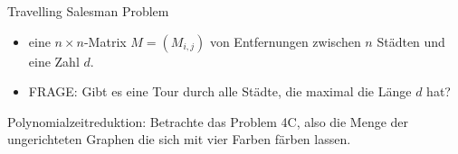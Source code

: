\documentclass[10pt, a4paper]{exam}
\begin{document}
\begin{questions}
\begin{parts}
\begin{solution}
      Travelling Salesman Problem
      \begin{itemize}
        \item eine $n\times n$-Matrix $M=(M_{i,j})$ von Entfernungen zwischen $n$ Städten und eine Zahl $d$.
        \item FRAGE: Gibt es eine Tour durch alle Städte, die maximal die Länge $d$ hat?
      \end{itemize}

    \end{solution}
  \end{parts}

  \question Polynomialzeitreduktion: Betrachte das Problem 4C, also die Menge der ungerichteten Graphen die sich mit vier Farben färben lassen.
\end{questions}
\end{document}

